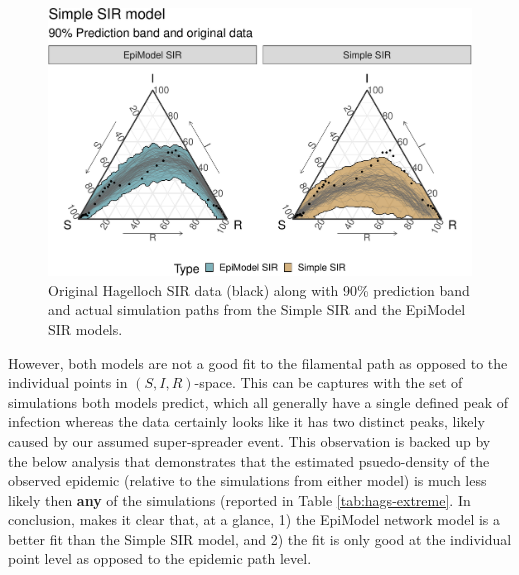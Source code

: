 \documentclass[
  shortnames]{jss}
\begin{document}
\begin{CodeChunk}
\begin{figure}[H]

{\centering \includegraphics{Figs/unnamed-chunk-17-1} 

}

\caption{\label{fig:hag-simple-sir}  Original Hagelloch SIR data (black) along with 90\% prediction band and actual simulation paths from the Simple SIR and the EpiModel SIR models.}\label{fig:unnamed-chunk-17}
\end{figure}
\end{CodeChunk}

However, both models are not a good fit to the filamental path as
opposed to the individual points in \((S, I, R)\)-space. This can be
captures with the set of simulations both models predict, which all
generally have a single defined peak of infection whereas the data
certainly looks like it has two distinct peaks, likely caused by our
assumed super-spreader event. This observation is backed up by the below
analysis that demonstrates that the estimated psuedo-density of the
observed epidemic (relative to the simulations from either model) is
much less likely then \textbf{any} of the simulations (reported in Table
\ref{tab:hags-extreme}. In conclusion,  makes it clear
that, at a glance, 1) the EpiModel network model is a better fit than
the Simple SIR model, and 2) the fit is only good at the individual
point level as opposed to the epidemic path level.
\end{document}
